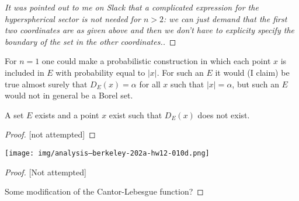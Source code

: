 \begin{enumerate}[label=(\alph*)]
\begin{proof}
    [It was pointed out to me on Slack that a complicated expression for the hyperspherical sector is not
    needed for $n > 2$: we can just demand that the first two coordinates are as given above and then we don't
    have to explicity specify the boundary of the set in the other coordinates.]
  \end{proof}

  \begin{remark*}
    For $n=1$ one could make a probabilistic construction in which each point $x$ is included in $E$ with
    probability equal to $|x|$. For such an $E$ it would (I claim) be true almost surely that $D_E(x) = \alpha$
    for all $x$ such that $|x| = \alpha$, but such an $E$ would not in general be a Borel set.

  \end{remark*}



  \begin{claim*}
     A set $E$ exists and a point $x$ exist such that $D_E(x)$ does not exist.
  \end{claim*}

  \begin{proof}

    [not attempted]
  \end{proof}
\end{enumerate}






\newpage
\begin{mdframed}
\texttt{[image: img/analysis--berkeley-202a-hw12-010d.png]}
\end{mdframed}

\begin{proof}

  [Not attempted]

  Some modification of the Cantor-Lebesgue function?
\end{proof}
